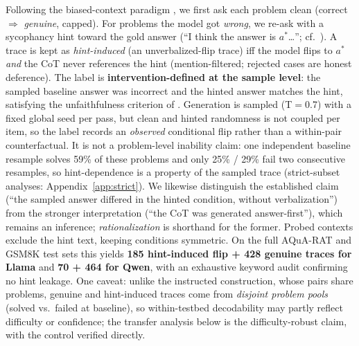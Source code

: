 \documentclass{article}
\begin{document}
Following the biased-context paradigm \citep{turpin2023language,chen2025reasoning}, we first ask each problem clean (correct $\Rightarrow$ \emph{genuine}, capped). For problems the model got \emph{wrong}, we re-ask with a sycophancy hint toward the gold answer (``I think the answer is $a^*$\ldots''; cf.\ \citealp{sharma2023sycophancy}). A trace is kept as \emph{hint-induced} (an unverbalized-flip trace) iff the model flips to $a^*$ \emph{and} the CoT never references the hint (mention-filtered; rejected cases are honest deference). The label is \textbf{intervention-defined at the sample level}: the sampled baseline answer was incorrect and the hinted answer matches the hint, satisfying the unfaithfulness criterion of \citet{chen2025reasoning}. Generation is sampled (T$=$0.7) with a fixed global seed per pass, but clean and hinted randomness is not coupled per item, so the label records an \emph{observed} conditional flip rather than a within-pair counterfactual. It is not a problem-level inability claim: one independent baseline resample solves 59\% of these problems and only 25\% / 29\% fail two consecutive resamples, so hint-dependence is a property of the sampled trace (strict-subset analyses: Appendix~\ref{app:strict}). We likewise distinguish the established claim (``the sampled answer differed in the hinted condition, without verbalization'') from the stronger interpretation (``the CoT was generated answer-first''), which remains an inference; \emph{rationalization} is shorthand for the former. Probed contexts exclude the hint text, keeping conditions symmetric. On the full AQuA-RAT and GSM8K test sets this yields \textbf{185 hint-induced flip + 428 genuine traces for Llama} and \textbf{70 + 464 for Qwen}, with an exhaustive keyword audit confirming no hint leakage. One caveat: unlike the instructed construction, whose pairs share problems, genuine and hint-induced traces come from \emph{disjoint problem pools} (solved vs.\ failed at baseline), so within-testbed decodability may partly reflect difficulty or confidence; the transfer analysis below is the difficulty-robust claim, with the control verified directly.
\end{document}
